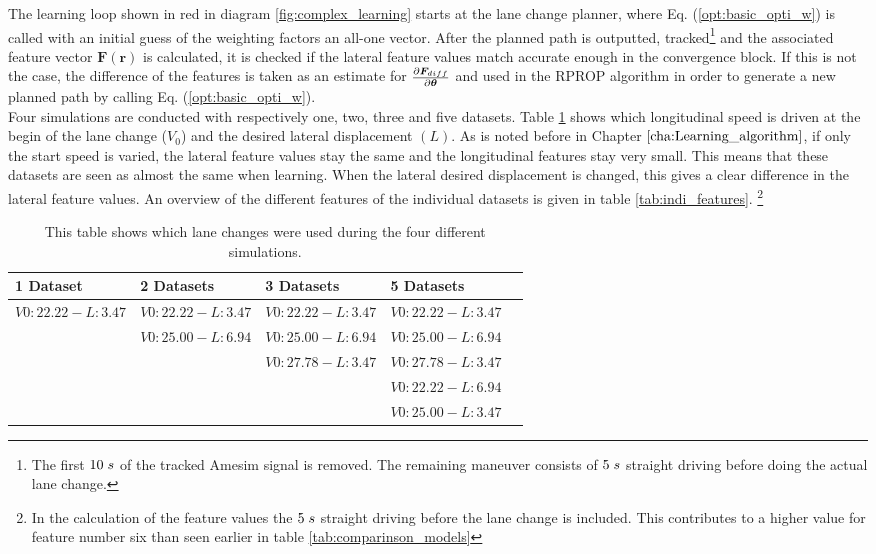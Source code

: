 The learning loop shown in red in diagram \ref{fig:complex_learning} starts at the lane change planner, where Eq. (\ref{opt:basic_opti_w}) is called with an initial guess of the weighting factors an all-one vector. After the planned path is outputted, tracked\footnote{The first $10 \hspace{1mm}s$ of the tracked Amesim signal is removed. The remaining maneuver consists of $5 \hspace{1mm}s$ straight driving before doing the actual lane change.} and the associated feature vector $\bm{F}(\bm{r})$ is calculated, it is checked if the lateral feature values match accurate enough in the convergence block. If this is not the case, the difference of the features is taken as an estimate for $\pdv{\bm{F}_{diff}}{\bm{\theta}}$ and used in the RPROP algorithm in order to generate a new planned path by calling Eq. (\ref{opt:basic_opti_w}). \\

Four simulations are conducted with respectively one, two, three and five datasets. Table \ref{tab:datasets_overview} shows which longitudinal speed is driven at the begin of the lane change ($V_{0}$) and the desired lateral displacement $(L)$. As is noted before in Chapter $\ref{cha:Learning_algorithm}$, if only the start speed is varied, the lateral feature values stay the same and the longitudinal features stay very small. This means that these datasets are seen as almost the same when learning. When the lateral desired displacement is changed, this gives a clear difference in the lateral feature values. An overview of the different features of the individual datasets is given in table \ref{tab:indi_features}. \footnote{In the calculation of the feature values the $5 \hspace{1mm}s$ straight driving before the lane change is included. This contributes to a higher value for feature number six than seen earlier in table \ref{tab:comparinson_models}}



\begin{table}[h!]
	\centering
	\begin{tabular}{@{}llllr@{}} \toprule
		1 Dataset    & 2 Datasets & 3 Datasets & 5 Datasets\\ \midrule
     $V0:22.22 - L:3.47$  & $V0:22.22 - L:3.47$    & $V0:22.22 - L:3.47$ & $V0:22.22 - L:3.47$		\\
           			 & $V0:25.00 - L:6.94$      & $V0:25.00 - L:6.94$    & $V0:25.00 - L:6.94$  \\
	        		 &        & $V0:27.78 - L:3.47$ & $V0:27.78 - L:3.47$      \\ 
&	&	&$V0:22.22 - L:6.94$	\\
&	&	&$V0:25.00 - L:3.47$	\\\bottomrule
	\end{tabular}
	\caption{This table shows which lane changes were used during the four different simulations.}
	\label{tab:datasets_overview}
\end{table} 



